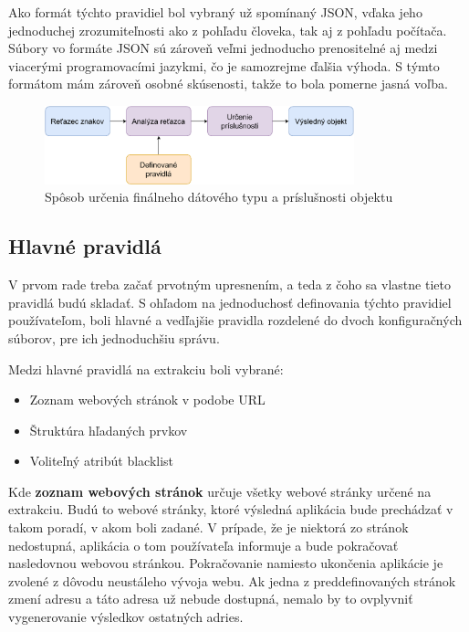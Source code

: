 Ako formát týchto pravidiel bol vybraný už spomínaný JSON, vďaka jeho jednoduchej zrozumiteľnosti ako z pohľadu človeka, tak aj z pohľadu počítača. Súbory vo formáte JSON sú zároveň veľmi jednoducho prenositelné aj medzi viacerými programovacími jazykmi, čo je samozrejme ďalšia výhoda. S týmto formátom mám zároveň osobné skúsenosti, takže to bola pomerne jasná voľba.

\bigskip

\begin{figure}[hbt]
	\centering
	\includegraphics[width=0.8\textwidth]{obrazky-figures/rules.pdf}
	\caption{Spôsob určenia finálneho dátového typu a príslušnosti objektu}
	\label{rules}
\end{figure}

\bigskip

\subsection{Hlavné pravidlá}

V prvom rade treba začať prvotným upresnením, a teda z čoho sa vlastne tieto pravidlá budú skladať. S ohľadom na jednoduchosť definovania týchto pravidiel používateľom, boli hlavné a vedľajšie pravidla rozdelené do dvoch konfiguračných súborov, pre ich jednoduchšiu správu. 

Medzi hlavné pravidlá na extrakciu boli vybrané:
\begin{itemize}
    \item {Zoznam webových stránok v podobe URL}
    \item {Štruktúra hľadaných prvkov}
    \item {Voliteľný atribút blacklist}
\end{itemize}

\bigskip

Kde \textbf{zoznam webových stránok} určuje všetky webové stránky určené na extrakciu. Budú to webové stránky, ktoré výsledná aplikácia bude prechádzať v takom poradí, v akom boli zadané. V prípade, že je niektorá zo stránok nedostupná, aplikácia o tom používateľa informuje a bude pokračovať nasledovnou webovou stránkou. Pokračovanie namiesto ukončenia aplikácie je zvolené z dôvodu neustáleho vývoja webu. Ak jedna z preddefinovaných stránok zmení adresu a táto adresa už nebude dostupná, nemalo by to ovplyvniť vygenerovanie výsledkov ostatných adries.

